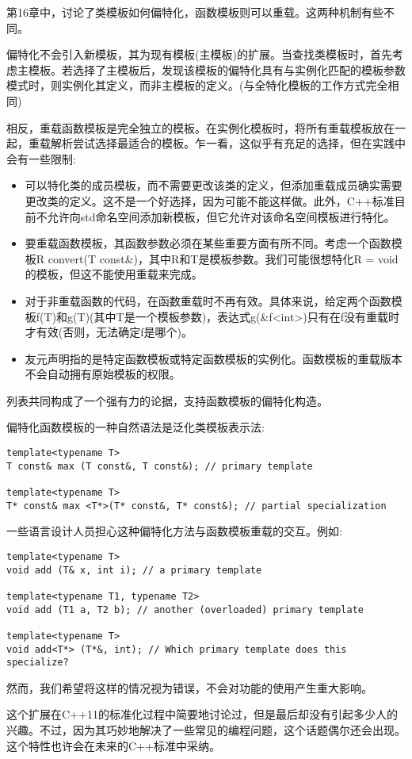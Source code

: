 
第16章中，讨论了类模板如何偏特化，函数模板则可以重载。这两种机制有些不同。

偏特化不会引入新模板，其为现有模板(主模板)的扩展。当查找类模板时，首先考虑主模板。若选择了主模板后，发现该模板的偏特化具有与实例化匹配的模板参数模式时，则实例化其定义，而非主模板的定义。(与全特化模板的工作方式完全相同)

相反，重载函数模板是完全独立的模板。在实例化模板时，将所有重载模板放在一起，重载解析尝试选择最适合的模板。乍一看，这似乎有充足的选择，但在实践中会有一些限制:

\begin{itemize}
\item 
可以特化类的成员模板，而不需要更改该类的定义，但添加重载成员确实需要更改类的定义。这不是一个好选择，因为可能不能这样做。此外，C++标准目前不允许向std命名空间添加新模板，但它允许对该命名空间模板进行特化。

\item 
要重载函数模板，其函数参数必须在某些重要方面有所不同。考虑一个函数模板R convert(T const\&)，其中R和T是模板参数。我们可能很想特化R = void的模板，但这不能使用重载来完成。

\item 
对于非重载函数的代码，在函数重载时不再有效。具体来说，给定两个函数模板f(T)和g(T)(其中T是一个模板参数)，表达式g(\&f<int>)只有在f没有重载时才有效(否则，无法确定f是哪个)。

\item 
友元声明指的是特定函数模板或特定函数模板的实例化。函数模板的重载版本不会自动拥有原始模板的权限。
\end{itemize}

列表共同构成了一个强有力的论据，支持函数模板的偏特化构造。

偏特化函数模板的一种自然语法是泛化类模板表示法:

\begin{lstlisting}[style=styleCXX]
template<typename T>
T const& max (T const&, T const&); // primary template

template<typename T>
T* const& max <T*>(T* const&, T* const&); // partial specialization
\end{lstlisting}

一些语言设计人员担心这种偏特化方法与函数模板重载的交互。例如:

\begin{lstlisting}[style=styleCXX]
template<typename T>
void add (T& x, int i); // a primary template

template<typename T1, typename T2>
void add (T1 a, T2 b); // another (overloaded) primary template

template<typename T>
void add<T*> (T*&, int); // Which primary template does this specialize?
\end{lstlisting}

然而，我们希望将这样的情况视为错误，不会对功能的使用产生重大影响。

这个扩展在C++11的标准化过程中简要地讨论过，但是最后却没有引起多少人的兴趣。不过，因为其巧妙地解决了一些常见的编程问题，这个话题偶尔还会出现。这个特性也许会在未来的C++标准中采纳。






















